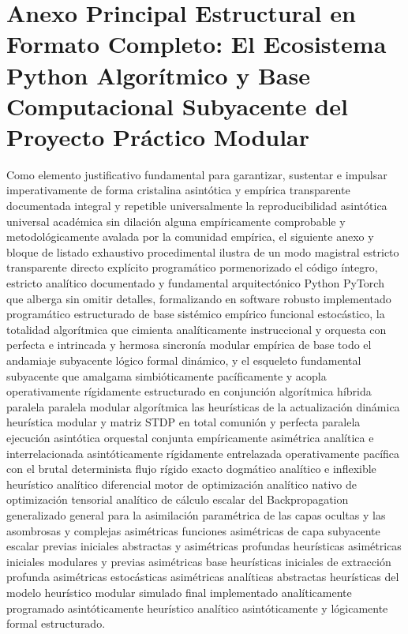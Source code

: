\documentclass[a4paper,12pt,twocolumn]{article}
\begin{document}
\section{Anexo Principal Estructural en Formato Completo: El Ecosistema Python Algorítmico y Base Computacional Subyacente del Proyecto Práctico Modular}
Como elemento justificativo fundamental para garantizar, sustentar e impulsar imperativamente de forma cristalina asintótica y empírica transparente documentada integral y repetible universalmente la reproducibilidad asintótica universal académica sin dilación alguna empíricamente comprobable y metodológicamente avalada por la comunidad empírica, el siguiente anexo y bloque de listado exhaustivo procedimental ilustra de un modo magistral estricto transparente directo explícito programático pormenorizado el código íntegro, estricto analítico documentado y fundamental arquitectónico Python PyTorch que alberga sin omitir detalles, formalizando en software robusto implementado programático estructurado de base sistémico empírico funcional estocástico, la totalidad algorítmica que cimienta analíticamente instruccional y orquesta con perfecta e intrincada y hermosa sincronía modular empírica de base todo el andamiaje subyacente lógico formal dinámico, y el esqueleto fundamental subyacente que amalgama simbióticamente pacíficamente y acopla operativamente rígidamente estructurado en conjunción algorítmica híbrida paralela paralela modular algorítmica las heurísticas de la actualización dinámica heurística modular y matriz STDP en total comunión y perfecta paralela ejecución asintótica orquestal conjunta empíricamente asimétrica analítica e interrelacionada asintóticamente rígidamente entrelazada operativamente pacífica con el brutal determinista flujo rígido exacto dogmático analítico e inflexible heurístico analítico diferencial motor de optimización analítico nativo de optimización tensorial analítico de cálculo escalar del Backpropagation generalizado general para la asimilación paramétrica de las capas ocultas y las asombrosas y complejas asimétricas funciones asimétricas de capa subyacente escalar previas iniciales abstractas y asimétricas profundas heurísticas asimétricas iniciales modulares y previas asimétricas base heurísticas iniciales de extracción profunda asimétricas estocásticas asimétricas analíticas abstractas heurísticas del modelo heurístico modular simulado final implementado analíticamente programado asintóticamente heurístico analítico asintóticamente y lógicamente formal estructurado.
\end{document}
